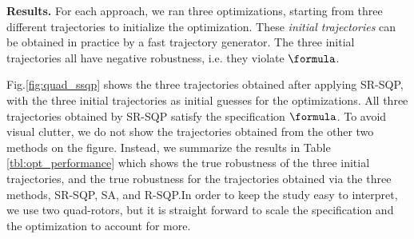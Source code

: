 
\textbf{Results.}
For each approach, we ran three optimizations, starting from three different trajectories to initialize the optimization. 
These \textit{initial trajectories} can be obtained in practice by a fast trajectory generator. The three initial trajectories all have negative robustness, i.e. they violate $\formula$.


Fig.\ref{fig:quad_ssqp} shows the three trajectories obtained after applying SR-SQP,
with the three initial trajectories as initial guesses for the optimizations. 
All three trajectories obtained by SR-SQP satisfy the specification $\formula$. 
To avoid visual clutter, we do not show the trajectories obtained from the other two methods on the figure.
Instead, we summarize the results in Table \ref{tbl:opt_performance} which shows the true robustness of the three initial trajectories, and the true robustness for the trajectories obtained via the three methods, SR-SQP, SA, and R-SQP.In order to keep the study easy to interpret, we use two quad-rotors, but it is straight forward to scale the specification and the optimization to account for more. 

